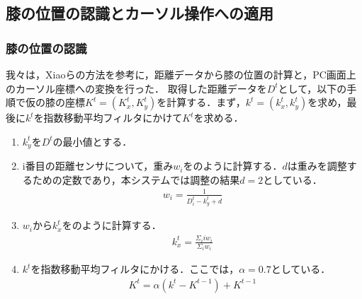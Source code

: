 \documentclass[submit, techrep]{ipsj}
\begin{document}

\subsection{膝の位置の認識とカーソル操作への適用}
\subsubsection{膝の位置の認識}
我々は，Xiao\cite{Xiao:2018:LOP:3173574.3173669}らの方法を参考に，距離データから膝の位置の計算と，PC画面上のカーソル座標への変換を行った．
取得した距離データを$D^t$として，以下の手順で仮の膝の座標$K^t=(K^t_x, K^t_y)$を計算する．まず，$k^t=(k^t_x, k^t_y)$を求め，最後に$k^t$を指数移動平均フィルタにかけて$K^t$を求める．
\begin{enumerate}
	\item $k^t_y$を$D^t$の最小値とする．
	\item i番目の距離センサについて，重み$w_i$をのように計算する．$d$は重みを調整するための定数であり，本システムでは調整の結果$d=2$としている．
	\begin{eqnarray}
		\label{eq:weight}
		w_i = \frac{1}{D^t_i - k^t_y + d}
	\end{eqnarray}
	\item $w_i$から$k^t_x$をのように計算する．
	\begin{eqnarray}
		\label{eq:calc_x}
			k^t_x = \frac{\Sigma_i iw_i}{\Sigma_i w_i}
	\end{eqnarray}
	\item $k^t$を指数移動平均フィルタにかける．ここでは，$\alpha=0.7$としている．
\begin{eqnarray}
	\label{eq:filter}
	K^t = \alpha (k^t - K^{t-1}) + K^{t-1}
	\end{eqnarray}
\end{enumerate}
\end{document}
